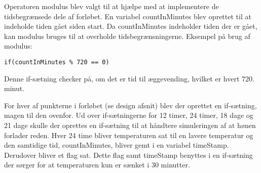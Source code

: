 Operatoren modulus blev valgt til at hjælpe med at implementere de tidsbegrænsede dele af forløbet.
En variabel countInMinutes blev oprettet til at indeholde tiden gået siden start.
Da countInMinutes indeholder tiden der er gået, kan modulus bruges til at overholde tidsbegrænsningerne.
Eksempel på brug af modulus: 

\texttt{if(countInMinutes \% 720 == 0)}

Denne if-sætning checker på, om det er tid til æggevending, hvilket er hvert 720. minut.

For hver af punkterne i forløbet (se design afsnit) blev der oprettet en if-sætning, magen til den ovenfor.
Ud over if-sætningerne for 12 timer, 24 timer, 18 dage og 21 dage skulle der oprettes en if-sætning til at håndtere simuleringen 
af at hønen forlader reden. 
Hver 24 time bliver temperaturen sat til en lavere temperatur og den samtidige tid, countInMinutes, bliver gemt i en variabel timeStamp.
Derudover bliver et flag sat.
Dette flag samt timeStamp benyttes i en if-sætning der sørger for at temperaturen kun er sænket i 30 minutter. 
